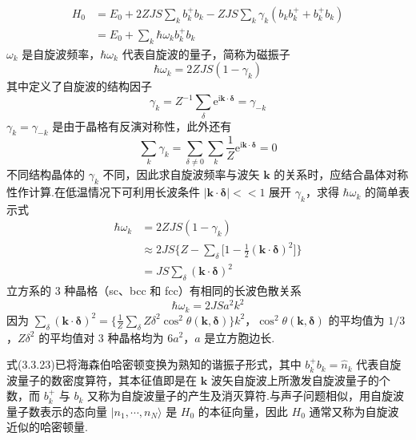 \begin{equation}
\begin{aligned}
  H_0&=E_0+2ZJS\sum_k b_k^{+}b_k-ZJS\sum_k\gamma_k\left(b_kb_k^{+}+b_k^{+}b_k\right)\\
  &=E_0+\sum_k\hbar\omega_k b_k^{+}b_k
\end{aligned}
\end{equation}
$\omega_k$ 是自旋波频率，$\hbar\omega_k$ 代表自旋波的量子，简称为磁振子
\begin{equation}
  \hbar\omega_k=2ZJS\left(1-\gamma_k\right)
\end{equation}
其中定义了自旋波的结构因子
\begin{equation}
  \gamma_k=Z^{-1}\sum_\delta\mathrm{e}^{\mathrm{i}\boldsymbol{k}\cdot\boldsymbol{\delta}}=\gamma_{-k}
\end{equation}
$\gamma_k=\gamma_{-k}$ 是由于晶格有反演对称性，此外还有
\begin{equation}
  \sum_k\gamma_k=\sum_{\delta\neq0}\sum_k\frac{1}{Z}\mathrm{e}^{\mathrm{i}\boldsymbol{k}\cdot\boldsymbol{\delta}}=0
\end{equation}
不同结构晶体的 $\gamma_k$ 不同，因此求自旋波频率与波矢 $\boldsymbol{k}$
的关系时，应结合晶体对称性作计算.在低温情况下可利用长波条件
$\left|\boldsymbol{k}\cdot\boldsymbol{\delta}\right|<\!<1$ 展开 $\gamma_k$，求得 $\hbar\omega_k$ 的简单表示式
\begin{equation}
\begin{aligned}
  \hbar\omega_k&=2ZJS\left(1-\gamma_k\right)\\
  &\approx 2JS\biggl\{Z-\sum_\delta\biggl[1-\frac{1}{2}\left(\boldsymbol{k}\cdot\boldsymbol{\delta}\right)^2\biggr]\biggr\}\\
  &=JS\sum_\delta\left(\boldsymbol{k}\cdot\boldsymbol{\delta}\right)^2
\end{aligned}
\end{equation}
立方系的 3 种晶格（sc、bcc 和 fcc）有相同的长波色散关系
\begin{equation}
  \hbar\omega_k=2JSa^2k^2
\end{equation}
因为
$\sum_\delta\left(\boldsymbol{k}\cdot\boldsymbol{\delta}\right)^2
=\biggl\{\frac{1}{Z}\sum_\delta Z\delta^2\cos^2\theta\left(\boldsymbol{k},\boldsymbol{\delta}\right)\biggr\}k^2$，$\cos^2\theta\left(\boldsymbol{k},\boldsymbol{\delta}\right)$
的平均值为 $1/3$，$Z\delta^2$ 的平均值对 3 种晶格均为 $6a^2$，$a$ 是立方胞边长.

式(3.3.23)已将海森伯哈密顿变换为熟知的谐振子形式，其中 $b_k^{+}b_k=\hat{n}_k$
代表自旋波量子的数密度算符，其本征值即是在 $\boldsymbol{k}$
波矢自旋波上所激发自旋波量子的个数，而 $b_k^{+}$ 与 $b_k$
又称为自旋波量子的产生及消灭算符.与声子问题相似，用自旋波量子数表示的态向量
$|n_1,\cdots,n_N\rangle$ 是 $H_0$ 的本征向量，因此 $H_0$ 通常又称为自旋波近似的哈密顿量.

